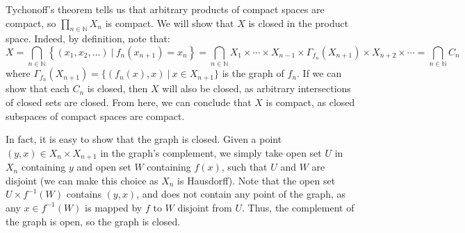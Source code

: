 \documentclass[aps,pra,showpacs,notitlepage,onecolumn,superscriptaddress,nofootinbib]{revtex4-1}
\theoremstyle{definition}
\begin{document}
Tychonoff's theorem tells us that arbitrary products of compact spaces are compact, so $\prod_{n \in \mathbb{N}} X_n$ is compact. We will show that $X$ is closed in the product space. Indeed, by definition, note that:
\begin{equation}
  X = \displaystyle\bigcap_{n \in \mathbb{N}} \left\{ (x_1, x_2, \dots) \ \Big| \ f_n(x_{n + 1}) = x_n \right\} = \displaystyle\bigcap_{n \in \mathbb{N}} X_1 \times \cdots \times X_{n - 1} \times \Gamma_{f_n}(X_{n + 1}) \times X_{n + 2} \times \cdots = \displaystyle\bigcap_{n \in \mathbb{N}} C_n
\end{equation}
where $\Gamma_{f_n}(X_{n + 1}) = \{ (f_n(x), x) \ | \ x \in X_{n + 1} \}$ is the graph of $f_n$. If we can show that each $C_n$ is closed, then $X$ will also be closed, as arbitrary intersections of closed sets are closed. From here, we can conclude that $X$ is compact,
as closed subspaces of compact spaces are compact.
\newline

\noindent In fact, it is easy to show that the graph is closed. Given a point $(y, x) \in X_n \times X_{n + 1}$ in the graph's complement, we simply take open set $U$ in $X_n$ containing $y$ and open set $W$ containing $f(x)$, such that $U$ and $W$ are disjoint (we
can make this choice as $X_n$ is Hausdorff). Note that the open set $U \times f^{-1}(W)$ contains $(y, x)$, and does not contain any point of the graph, as any $x \in f^{-1}(W)$ is mapped by $f$ to $W$ disjoint from $U$. Thus, the complement of the graph is open, so the graph is closed.
\newline
\end{document}
